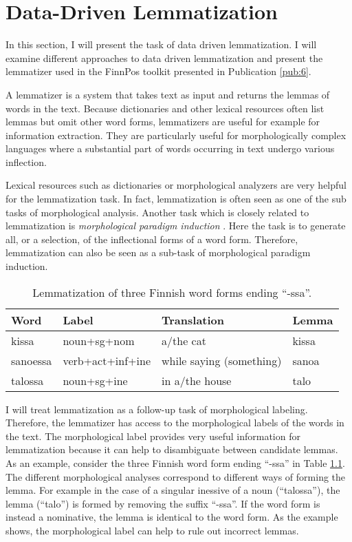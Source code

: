 \chapter{Data-Driven Lemmatization}
\label{chapter:lemmatization}

In this section, I will present the task of data driven
lemmatization. I will examine different approaches to data driven
lemmatization and present the lemmatizer used in the FinnPos toolkit
presented in Publication \ref{pub:6}.

A lemmatizer is a system that takes text as input and returns the
lemmas of words in the text. Because dictionaries and other lexical
resources often list lemmas but omit other word forms, lemmatizers are
useful for example for information extraction. They are particularly
useful for morphologically complex languages where a substantial part of
words occurring in text undergo various inflection.

Lexical resources such as dictionaries or morphological analyzers are
very helpful for the lemmatization task. In fact, lemmatization is
often seen as one of the sub tasks of morphological analysis. Another
task which is closely related to lemmatization is {\it morphological
  paradigm induction} \citep{Ahlberg2014}. Here the task is to
generate all, or a selection, of the inflectional forms of a word
form. Therefore, lemmatization can also be seen as a sub-task of
morphological paradigm induction.

\begin{table}[!htb]
\begin{center}
\begin{tabular}{l|l|l|l}
\hline
Word & Label & Translation & Lemma  \\
\hline
kissa & noun+sg+nom & a/the cat & kissa \\
sanoessa & verb+act+inf+ine & while saying (something) & sanoa \\
talossa & noun+sg+ine & in a/the house & talo
\end{tabular}
\caption{Lemmatization of three Finnish word forms ending ``-ssa''.}\label{tab:3wf}
\end{center}
\end{table}

I will treat lemmatization as a follow-up task of morphological
labeling. Therefore, the lemmatizer has access to the morphological
labels of the words in the text. The morphological label provides very
useful information for lemmatization because it can help to
disambiguate between candidate lemmas. As an example, consider the
three Finnish word form ending ``-ssa'' in Table \ref{tab:3wf}. The
different morphological analyses correspond to different ways of
forming the lemma. For example in the case of a singular inessive of a
noun (``talossa''), the lemma (``talo'') is formed by removing the
suffix ``-ssa''. If the word form is instead a nominative, the lemma
is identical to the word form. As the example shows, the morphological
label can help to rule out incorrect lemmas.


